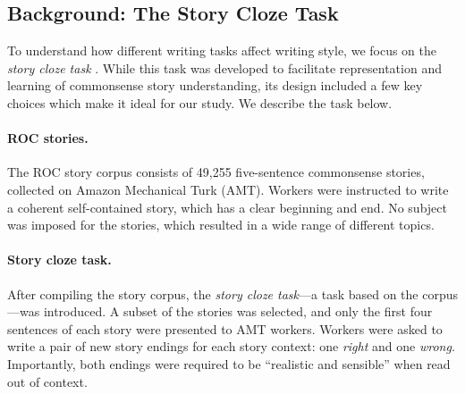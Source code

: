 \documentclass[11pt,a4paper]{article}
\newcommand{\isubsection}[2]{\subsection{#1}\label{ssec:#2}}
\newcommand{\shortv}[1]{}
\begin{document}
\isubsection{Background: The Story Cloze Task}{ROC_Story}
To understand how different writing tasks affect writing style, 
we focus on the \textit{story cloze task} \cite{Mostafazadeh:2016}. 
While this task was developed to facilitate representation and learning of commonsense story understanding,
its design included a few key choices which  make it ideal for our study. 
We describe the task below.




\paragraph{ROC stories.}

The ROC story corpus consists of 49,255 five-sentence commonsense
stories, collected on Amazon Mechanical Turk (AMT).\shortv{\footnote{Recently,
  an additional 53K stories were released, which results in roughly
  100K stories.}}
Workers were instructed to write a coherent self-contained story, which has a clear beginning and end. 
\shortv{To collect a broad spectrum of commonsense knowledge,  n}No subject was imposed for the stories,
which resulted in a wide range of different topics.

\paragraph{Story cloze task.}
After compiling the story corpus, the {\it story cloze task}---a task based on the corpus---was introduced.
A subset of the stories was selected, and only the first four sentences of each story were presented to AMT workers.
Workers were asked to write a pair of new story endings for each story context: one {\it right} and one {\it wrong}\shortv{. Both endings were required to complete the story using one of the characters in the story context. Additionally,  }. 
Importantly, both endings were required to be ``realistic and sensible'' \cite{Mostafazadeh:2016} when read out of context.

\shortv{The resulting stories, both {\it right} and {\it wrong}, were then individually rated for coherence and meaningfulness by additional AMT workers.
Only stories rated as simultaneously coherent with a {\it right} ending and neutral with a {\it wrong} ending were selected for the task. 
It is worth noting that workers rated the stories as a whole, not only the endings.}
\end{document}
